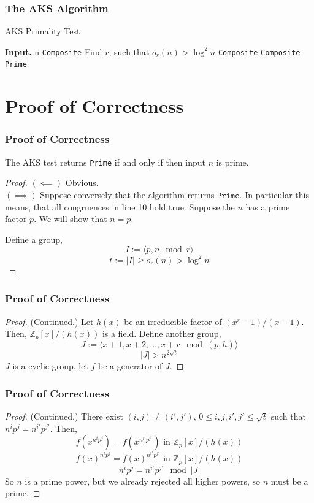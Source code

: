 \documentclass[11pt]{beamer}
\newcommand{\ZZ}{\mathbb{Z}}
\begin{document}
\begin{frame}
  \frametitle{The AKS Algorithm}
\begin{algorithm}[H]
\caption{AKS Primality Test}\label{alg:aks}
\begin{algorithmic}[1]
  \State \textbf{Input.} n
  \State \Return \texttt{Composite}
  \EndIf
  \State Find $r$, such that $o_r(n) > \log^2 n$
  \State \Return \texttt{Composite}
  \EndIf
  \If{$(x + a)^n \ne x^n + a \text{ in } \ZZ_n[x]/(x^r - 1)$}
  \State \Return \texttt{Composite}
  \EndIf
  \EndFor
  \State \Return \texttt{Prime}
\end{algorithmic}
\end{algorithm}
\end{frame}

\section{Proof of Correctness}
\begin{frame}
  \frametitle{Proof of Correctness}
\begin{theorem}
  The AKS test returns \texttt{Prime} if and only if then input $n$ is prime.
\end{theorem}
\begin{proof}
  $(\impliedby)$ Obvious.\\
  $(\implies)$ Suppose conversely that the algorithm
  returns $\texttt{Prime}$. In particular this means, that all congruences
  in line 10 hold true. Suppose the $n$ has a prime factor $p$. We will
  show that $n = p$.

  Define a group,
  \[
    I := \langle p, n \mod r\rangle
  \]
  \[
    t := |I| \ge o_r(n) > \log^2 n
  \]
\end{proof}
\end{frame}

\begin{frame}
  \frametitle{Proof of Correctness}
  \begin{proof}(Continued.)
    Let $h(x)$ be an irreducible factor of $(x^r-1)/(x-1)$. Then, $\ZZ_p[x]/(h(x))$
    is a field.
    Define another group,
  \[
    J := \langle x+1, x+2, \dots, x+ r \mod (p, h)\rangle
  \]
  \[
    |J| > n^{2\sqrt{t}}
  \]
  $J$ is a cyclic group, let $f$ be a generator of $J$.
\end{proof}
\end{frame}

\begin{frame}
  \frametitle{Proof of Correctness}
  \begin{proof}(Continued.)
    There exist $(i, j) \ne (i', j')$, $0 \le i, j, i', j' \le \sqrt{t}$
    such that $n^{i}p^{j} = n^{i'}p^{j'}$. Then,
    \[
      f(x^{n^{i}p^j}) = f(x^{n^{i'}p^{j'}}) \text{ in } \ZZ_p[x]/(h(x))
    \]\[
      f(x)^{n^{i}p^j} = f(x)^{n^{i'}p^{j'}} \text{ in } \ZZ_p[x]/(h(x))
    \]\[
      {n^{i}p^j} = {n^{i'}p^{j'}} \mod |J|
    \]
    So $n$ is a prime power, but we already rejected all higher powers,
    so $n$ must be a prime.
  \end{proof}
\end{frame}
\end{document}
